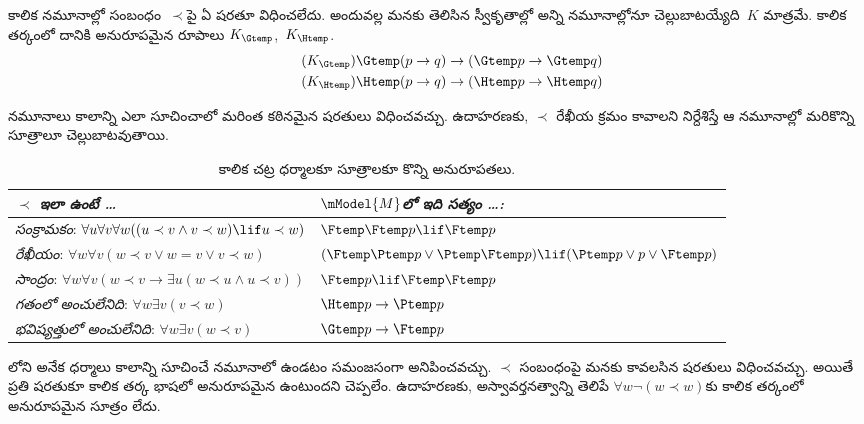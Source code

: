\documentclass[../../../include/open-logic-section]{subfiles}
\begin{document}


కాలిక నమూనాల్లో సంబంధం~$\prec$పై ఏ షరతూ విధించలేదు.
అందువల్ల మనకు తెలిసిన స్వీకృతాల్లో అన్ని నమూనాల్లోనూ చెల్లుబాటయ్యేది~$K$
మాత్రమే. కాలిక తర్కంలో దానికి అనురూపమైన రూపాలు
$K_{\Gtemp}$,~$K_{\Htemp}$.
\begin{align*}
\tag{$K_{\Gtemp}$}  \Gtemp (p \to q) & \to (\Gtemp p \to \Gtemp q)\\
\tag{$K_{\Htemp}$}  \Htemp (p \to q) & \to (\Htemp p \to \Htemp q)
\end{align*}

నమూనాలు కాలాన్ని ఎలా సూచించాలో మరింత కఠినమైన షరతులు విధించవచ్చు.
ఉదాహరణకు, $\prec$ రేఖీయ క్రమం కావాలని నిర్దేశిస్తే
ఆ నమూనాల్లో మరికొన్ని సూత్రాలూ చెల్లుబాటవుతాయి.

\begin{table}[t]
  \begin{tabular}{| p{} || p{} |}
    \hline
    {\emph{$\prec$ ఇలా ఉంటే \dots}} & {\emph{$\mModel{M}$లో ఇది సత్యం \dots:}} \\
    \hline \hline
    \emph{సంక్రామకం}: \newline
    $\forall u \forall v \forall w ((u \prec v \land v \prec w) \lif u \prec w)$ &
    $\Ftemp \Ftemp p \lif \Ftemp p$  \\
    \hline
    \emph{రేఖీయం}: \newline
    $\forall w \forall v (w \prec v \lor w = v \lor v \prec w)$ &
    $(\Ftemp \Ptemp  p \lor \Ptemp \Ftemp p) \lif (\Ptemp p \lor p \lor \Ftemp p)$\\
    \hline
    \emph{సాంద్రం}: \newline
    $\forall w \forall v (w \prec v \to \exists u(w \prec u \land u \prec v))$ &
    $\Ftemp p \lif \Ftemp \Ftemp p$ \\
    \hline
    \emph{గతంలో అంచులేనిది}: \newline
    $\forall w \exists v( v \prec w)$ &
    $\Htemp p \to \Ptemp p$ \\
    \hline
    \emph{భవిష్యత్తులో అంచులేనిది}: \newline
    $\forall w \exists v( w \prec v)$ &
    $\Gtemp p \to \Ftemp p$ \\
    \hline
  \end{tabular}
  \caption{కాలిక చట్ర ధర్మాలకూ సూత్రాలకూ కొన్ని అనురూపతలు.}
\end{table}

లోని అనేక ధర్మాలు కాలాన్ని
సూచించే నమూనాలో ఉండటం సమంజసంగా అనిపించవచ్చు.
$\prec$ సంబంధంపై మనకు కావలసిన షరతులు విధించవచ్చు.
అయితే ప్రతి షరతుకూ కాలిక తర్క భాషలో అనురూపమైన
 ఉంటుందని చెప్పలేం. ఉదాహరణకు,
అస్వావర్తనత్వాన్ని తెలిపే $\forall w \lnot (w \prec w)$కు
కాలిక తర్కంలో అనురూపమైన సూత్రం లేదు.
\end{document}
